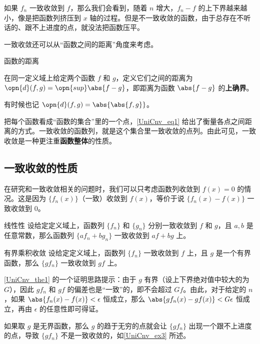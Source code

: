 如果 $f_n$ 一致收敛到 $f$，那么我们会看到，随着 $n$ 增大，$f_n-f$ 的上下界越来越小，像是把函数列挤压到 $x$ 轴的过程。但是不一致收敛的函数，由于总存在不听话的、跟不上进度的点，就没法把函数压平。

一致收敛还可以从“函数之间的距离”角度来考虑。

\begin{definition}{函数的距离}\label{UniCnv_def1}

在同一定义域上给定两个函数 $f$ 和 $g$，定义它们之间的距离为 $\opn{d}(f, g)=\opn{sup}\abs{f-g}$，即距离为函数 $\abs{f-g}$ 的\textbf{上确界}。

有时候也记 $\opn{d}(f, g)=\abs{\abs{f, g}}$。

\end{definition}

把每个函数看成“函数的集合”里的一个点，\autoref{UniCnv_eq1} 给出了衡量各点之间距离的方式。一致收敛的函数列，就是这个集合里一致收敛的点列。由此可见，一致收敛是一种更注重\textbf{函数整体}的性质。


\subsection{一致收敛的性质}

在研究和一致收敛相关的问题时，我们可以只考虑函数列收敛到 $f(x)=0$ 的情况。这是因为 $\{f_n(x)\}$（一致）收敛到 $f(x)$，等价于说 $\{f_n(x)-f(x)\}$ 一致收敛到 $0$。

\begin{theorem}{线性性}
设给定定义域上，函数列 $\{f_n\}$ 和 $\{g_n\}$ 分别一致收敛到 $f$ 和 $g$，且 $a, b$ 是任意常数，那么函数列 $\{af_n+bg_n\}$ 一致收敛到 $af+bg$ 上。
\end{theorem}

\begin{theorem}{有界乘积收敛}\label{UniCnv_the1}
设给定定义域上，函数列 $\{f_n\}$ 一致收敛到 $f$ 上，且 $g$ 是一个有界函数，那么 $\{gf_n\}$ 一致收敛到 $gf$ 上。
\end{theorem}

\autoref{UniCnv_the1} 的一个证明思路提示：由于 $g$ 有界（设上下界绝对值中较大的为 $G$），因此 $gf_n$ 和 $gf$ 的偏差也是“一致”的，即不会超过 $Gf$。由此，对于给定的 $n$，如果 $\abs{f_n(x)-f(x)}<\epsilon$ 恒成立，那么 $\abs{gf_n(x)-gf(x)}<G\epsilon$ 恒成立，再由 $\epsilon$ 的任意性即可得证。

如果取 $g$ 是无界函数，那么 $g$ 的趋于无穷的点就会让 $\{gf_n\}$ 出现一个跟不上进度的点，导致 $\{gf_n\}$ 不是一致收敛的，如\autoref{UniCnv_ex3} 所述。

